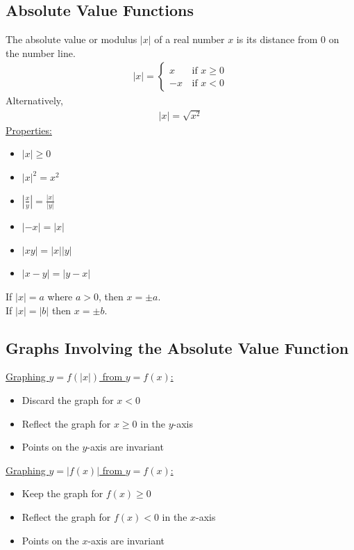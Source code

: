 \documentclass[10pt, a4paper, titlepage]{article}
\begin{document}
\begin{multicols*}{3}
	\dotfill
	\subsection{Absolute Value Functions}
	The absolute value or modulus $|x|$ of a real number $x$ is its distance from 0 on the number line.
	\begin{align}
		|x|=
		\begin{cases}
			x\,&\text{if } x\geq 0\\
			-x\,&\text{if } x < 0 
		\end{cases}
	\end{align}
	Alternatively,
	\begin{align}
		|x|=\sqrt{x^2}
	\end{align}
	\underline{Properties:}
	\begin{itemize}
		\item $|x|\geq0$
		\item $|x|^2=x^2$
		\item $\left|\frac{x}{y}\right|=\frac{\left|x\right|}{\left|y\right|}$
		\item $|-x|=|x|$
		\item $|xy|=|x||y|$
		\item $|x-y|=|y-x|$
	\end{itemize}
	If $|x|=a$ where $a>0$, then $x=\pm a$.\\
	If $|x|=|b|$ then $x=\pm b$.

	\dotfill
	\subsection{Graphs Involving the Absolute Value Function}
	\underline{Graphing $y=f(|x|)$ from $y=f(x)$:}
	\begin{itemize}
		\item Discard the graph for $x<0$
		\item Reflect the graph for $x\geq 0$ in the $y$-axis
		\item Points on the $y$-axis are invariant
	\end{itemize}
	\underline{Graphing $y=|f(x)|$ from $y=f(x)$:}
	\begin{itemize}
		\item Keep the graph for $f(x)\geq 0$
		\item Reflect the graph for $f(x)<0$ in the $x$-axis
		\item Points on the $x$-axis are invariant
	\end{itemize}
	\hrulefill



\end{multicols*}
\end{document}
